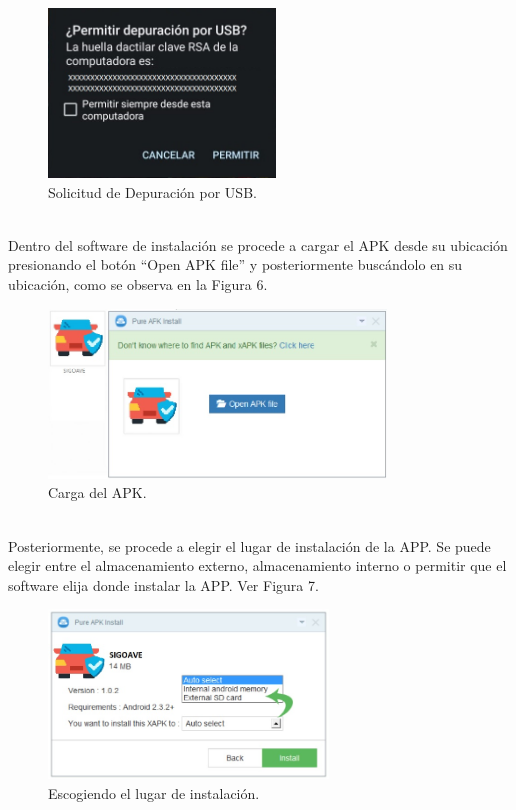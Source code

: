 \documentclass[a4paper,10pt, oneside, titlepage]{article}
\begin{document}
	\begin{figure}[!h]
		\centering
		\includegraphics[width = 0.7\linewidth, height = 4.5cm]{5.jpeg}
		\caption{Solicitud de Depuración por USB.}
	\end{figure}\\
	Dentro del software de instalación se procede a cargar el APK desde su ubicación presionando el botón ``Open APK file'' y posteriormente buscándolo en su ubicación, como se observa en la Figura 6.
	\begin{figure}[!h]
		\centering
		\includegraphics[width = 0.7\linewidth, height = 4.5cm]{6.jpg}
		\caption{Carga del APK.}
	\end{figure}\\
	Posteriormente, se procede a elegir el lugar de instalación de la APP. Se puede elegir entre el almacenamiento externo, almacenamiento interno o permitir que el software elija donde instalar la APP. Ver Figura 7.
	\begin{figure}[h]
		\centering
		\includegraphics[width = 0.7\linewidth, height = 4.5cm]{7.jpg}
		\caption{Escogiendo el lugar de instalación.}
	\end{figure}\\
\end{document}
